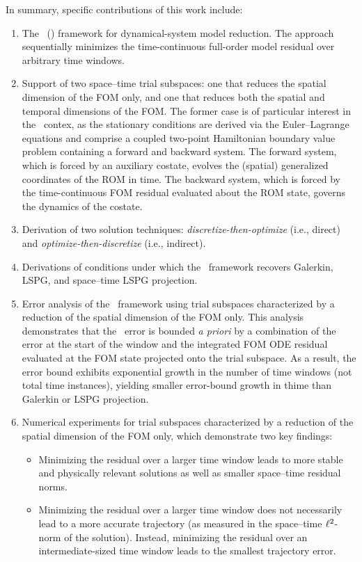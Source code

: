 \documentclass[3p,computermodern,10pt]{elsarticle}
\begin{document}
 In summary, specific contributions of this work include:
\begin{enumerate}
\item The \methodNameLower\ (\methodAcronym) framework for dynamical-system
	model reduction. The approach sequentially minimizes the time-continuous
		full-order model residual over arbitrary time windows.
\item Support of two space--time trial subspaces: one that reduces the spatial
	dimension of the FOM only, and one that reduces both the spatial and
		temporal dimensions of the FOM. The former case is of particular
		interest in the \methodAcronym\  contex, as the stationary conditions are
		derived via the Euler--Lagrange equations and comprise a coupled two-point
		Hamiltonian boundary value problem containing a forward and backward
		system. The forward system, which is forced by an auxiliary costate,
		evolves the (spatial) generalized coordinates of the ROM in time. The
		backward system, which is forced by the time-continuous FOM residual
		evaluated about the ROM state, governs the dynamics of the costate. 
	\item Derivation of two solution techniques:
		\textit{discretize-then-optimize} (i.e., direct) and
		\textit{optimize-then-discretize} (i.e., indirect). 
	\item Derivations of conditions under which the
		\methodAcronym\ framework recovers Galerkin, LSPG, and space--time LSPG
		projection.
\item Error analysis of the \methodAcronym\ framework using
	trial subspaces characterized by a reduction of
the spatial dimension of the FOM only.
	This analysis demonstrates that the \methodAcronymROMs\ error 
		is bounded \textit{a priori} by a combination of the
		error at the start of the window and the integrated FOM ODE residual
		evaluated at the FOM state projected onto the trial subspace. As a result,
		the error bound exhibits exponential growth in the number of time windows
		(not total time instances), yielding smaller error-bound growth in thime than
		Galerkin or LSPG projection. 
\item Numerical experiments for 
	trial subspaces characterized by a reduction of
the spatial dimension of the FOM only, which demonstrate two key findings:
\begin{itemize}
\item Minimizing the residual over a larger time window leads to more stable
	and physically relevant solutions  as
		well as smaller space--time residual norms. 
\item Minimizing the residual over a larger time window does not necessarily
	lead to a more accurate trajectory (as measured in the space--time
		$\ell^2$-norm of the solution). Instead, minimizing the residual over an
		intermediate-sized time window leads to the smallest trajectory error.
\end{itemize}
\end{enumerate}
\end{document}
